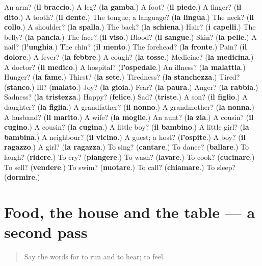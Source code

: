 \begin{tcolorbox}[breakable,colback=teal!4,colframe=teal!35!black,title={Before you move on}]
An arm? (\textbf{il braccio}.) A leg? (\textbf{la gamba}.) A foot? (\textbf{il piede}.) A finger? (\textbf{il dito}.) A tooth? (\textbf{il dente}.) The tongue; a language? (\textbf{la lingua}.) The neck? (\textbf{il collo}.) A shoulder? (\textbf{la spalla}.) The back? (\textbf{la schiena}.) Hair? (\textbf{i capelli}.) The belly? (\textbf{la pancia}.) The face? (\textbf{il viso}.) Blood? (\textbf{il sangue}.) Skin? (\textbf{la pelle}.) A nail? (\textbf{l'unghia}.) The chin? (\textbf{il mento}.) The forehead? (\textbf{la fronte}.) Pain? (\textbf{il dolore}.) A fever? (\textbf{la febbre}.) A cough? (\textbf{la tosse}.) Medicine? (\textbf{la medicina}.) A doctor? (\textbf{il medico}.) A hospital? (\textbf{l'ospedale}.) An illness? (\textbf{la malattia}.) Hunger? (\textbf{la fame}.) Thirst? (\textbf{la sete}.) Tiredness? (\textbf{la stanchezza}.) Tired? (\textbf{stanco}.) Ill? (\textbf{malato}.) Joy? (\textbf{la gioia}.) Fear? (\textbf{la paura}.) Anger? (\textbf{la rabbia}.) Sadness? (\textbf{la tristezza}.) Happy? (\textbf{felice}.) Sad? (\textbf{triste}.) A son? (\textbf{il figlio}.) A daughter? (\textbf{la figlia}.) A grandfather? (\textbf{il nonno}.) A grandmother? (\textbf{la nonna}.) A husband? (\textbf{il marito}.) A wife? (\textbf{la moglie}.) An aunt? (\textbf{la zia}.) A cousin? (\textbf{il cugino}.) A cousin? (\textbf{la cugina}.) A little boy? (\textbf{il bambino}.) A little girl? (\textbf{la bambina}.) A neighbour? (\textbf{il vicino}.) A guest; a host? (\textbf{l'ospite}.) A boy? (\textbf{il ragazzo}.) A girl? (\textbf{la ragazza}.) To sing? (\textbf{cantare}.) To dance? (\textbf{ballare}.) To laugh? (\textbf{ridere}.) To cry? (\textbf{piangere}.) To wash? (\textbf{lavare}.) To cook? (\textbf{cucinare}.) To sell? (\textbf{vendere}.) To swim? (\textbf{nuotare}.) To call? (\textbf{chiamare}.) To sleep? (\textbf{dormire}.)
\end{tcolorbox}
\section[(dialogue)]{Food, the house and the table — a second pass}

\label{lesson:IT-R60-second-pass-food-the-house-and-the-table}



\begin{quote}
Say the words for to run and to hear; to feel.
\end{quote}

